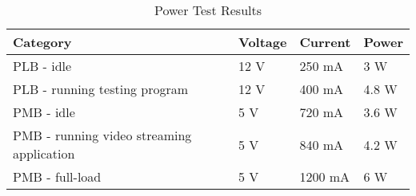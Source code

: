 \begin{table}[H]
    \caption{Power Test Results}
	\centering
	\begin{tabular}{llll}
	\hline
	\textbf{Category} & \textbf{Voltage} & \textbf{Current} & \textbf{Power} \\
	\hline
    PLB - idle & 12 V & 250 mA & 3 W\\
    PLB - running testing program & 12 V & 400 mA & 4.8 W\\
    PMB - idle & 5 V & 720 mA & 3.6 W\\
    PMB - running video streaming application & 5 V & 840 mA & 4.2 W\\
    PMB - full-load & 5 V & 1200 mA & 6 W\\
	\hline
	\end{tabular}
\end{table}